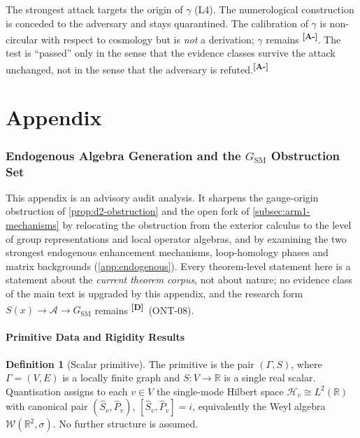 \documentclass[12pt,a4paper,twoside]{article}
\theoremstyle{plain}
\theoremstyle{definition}
\newtheorem{definition}[theorem]{Definition}
\theoremstyle{remark}
\newcommand{\catmark}[1]{\textsuperscript{\textsf{\textbf{[#1]}}}}
\begin{document}
\begin{governancebox}
The strongest attack targets the origin of $\gamma$ (L4). The numerological construction is conceded to the adversary and stays quarantined. The calibration of $\gamma$ is non-circular with respect to cosmology but is \emph{not} a derivation; $\gamma$ remains \catmark{A-}. The test is ``passed'' only in the sense that the evidence classes survive the attack unchanged, not in the sense that the adversary is refuted.\catmark{A-}
\end{governancebox}

\newpage
\appendix
\part*{Appendix}

\section{Endogenous Algebra Generation and the $G_{\mathrm{SM}}$ Obstruction Set}
\label{app:insertion-points}

\begin{governancebox}
This appendix is an advisory audit analysis. It sharpens the gauge-origin
obstruction of \cref{prop:d2-obstruction} and the open fork of
\cref{subsec:arm1-mechanisms} by relocating the obstruction from the exterior
calculus to the level of group representations and local operator algebras,
and by examining the two strongest endogenous enhancement mechanisms,
loop-homology phases and matrix backgrounds (\cref{app:endogenous}).
Every theorem-level statement here is a statement about the \emph{current
theorem corpus}, not about nature; no evidence class of the main text is
upgraded by this appendix, and the research form
$S(x)\to\mathcal{A}\to G_{\mathrm{SM}}$ remains \catmark{D}\ (ONT-08).
\end{governancebox}

\subsection{Primitive Data and Rigidity Results}
\label{app:rigidity}

\begin{definition}[Scalar primitive]
\label{def:scalar-primitive}
The primitive is the pair $(\Gamma, S)$, where $\Gamma=(V,E)$ is a locally
finite graph and $S:V\to\mathbb{R}$ is a single real scalar. Quantisation
assigns to each $v\in V$ the single-mode Hilbert space
$\mathcal{H}_v \cong L^2(\mathbb{R})$ with canonical pair
$(\hat S_v,\hat P_v)$, $[\hat S_v,\hat P_v]=i$, equivalently the Weyl algebra
$\mathcal{W}(\mathbb{R}^2,\sigma)$. No further structure is assumed.
\end{definition}
\end{document}
